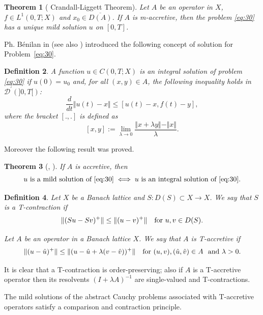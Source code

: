 \documentclass[reqno,12pt]{amsart}
\newtheorem{theorem}{Theorem}[section]
\newtheorem{definition}[theorem]{Definition}
\numberwithin{equation}{section} %
\begin{document}
\begin{theorem}[ Crandall-Liggett Theorem]\label{EUm-accretive} Let $A$ be an operator in $X$, $f \in L^1(0, T; X)$ and $x_0
\in \overline{D(A)}$. If $A$ is m-accretive, then the problem \eqref{eq:30}
has a unique mild solution $u$ on  $[0, T]$.
\end{theorem}

  Ph. Bénilan in \cite{B} (see also \cite{Benilanbook}) introduced the following concept of solution for Problem~\eqref{eq:30}.
\begin{definition}\label{intSol}\rm  A function $u \in C(0, T; X)$ is an {\it integral solution} of problem \eqref{eq:30} if $u(0) = u_0$ and, for all $(x,y) \in A$, the following inequality holds in $\mathcal{D}^{\prime}(]0,T[)$:
\begin{equation}\label{E1IntSol}\frac{d}{dt} \Vert u(t) - x \Vert \leq [u(t) - x, f(t) - y],
\end{equation}
  where  the bracket $[.,.]$ is defined as
$$[x,y]:= \lim_{\lambda \to 0} \frac{\Vert x + \lambda y \Vert - \Vert x \Vert}{\lambda}.$$
\end{definition}
Moreover  the following result was proved. 
 \begin{theorem}[\cite{B}, \cite{Benilanbook}]\label{mildInt} If $A$ is accretive, then
 $$u \ \hbox{is a mild solution of} \ \eqref{eq:30} \iff u \ \hbox{is an integral solution of} \ \eqref{eq:30}.$$
\end{theorem}
 



\begin{definition}{\rm Let $X$ be a Banach lattice and $S : D(S) \subset
X \rightarrow X$. We say that $S$ is a  
T-contraction  if
$$\Vert (Su - Sv)^+ \Vert \leq \Vert (u - v)^+ \Vert \ \ \
\hbox{for} \ u, v \in D(S).$$

Let $A$ be an operator in a Banach lattice $X$. We say that $A$ is  
T-accretive   if
$$\Vert (u - \hat u)^+ \Vert \leq \Vert (u - \hat u + \lambda (v - \hat v))^+
\Vert \ \ \ \hbox{for} \ (u, v), (\hat u, \hat v) \in A \ \
\hbox{and} \ \lambda > 0.$$ }
\end{definition}

It is clear that a T-contraction is order-preserving; also if
$A$ is a T-accretive operator then its resolvents $(I + \lambda
A)^{-1}$ are single-valued  and T-contractions.

 The mild solutions of the abstract
 Cauchy problems associated with T-accretive operators satisfy
 a comparison and contraction principle.
\end{document}
